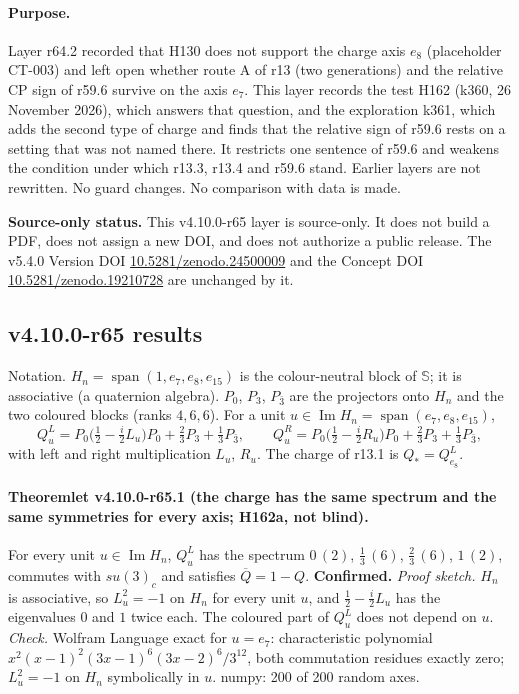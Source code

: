 \paragraph{Purpose.}
Layer r64.2 recorded that H130 does not support the charge axis \(e_8\) (placeholder CT-003) and left open whether route A of r13 (two generations)
and the relative CP sign of r59.6 survive on the axis \(e_7\).  This layer records the test H162 (k360, 26 November 2026), which answers that
question, and the exploration k361, which adds the second type of charge and finds that the relative sign of r59.6 rests on a setting that was
not named there.  It restricts one sentence of r59.6 and weakens the condition under which r13.3, r13.4 and r59.6 stand.  Earlier layers are not
rewritten.  No guard changes.  No comparison with data is made.

\noindent\textbf{Source-only status.}
This v4.10.0-r65 layer is source-only.  It does not build a PDF, does not assign a new DOI,
and does not authorize a public release.  The v5.4.0 Version DOI
\href{https://doi.org/10.5281/zenodo.24500009}{10.5281/zenodo.24500009} and the Concept DOI
\href{https://doi.org/10.5281/zenodo.19210728}{10.5281/zenodo.19210728} are unchanged by it.

\subsection*{v4.10.0-r65 results}
\label{subsec:v4100-r65-results}

Notation.  \(H_n=\operatorname{span}(1,e_7,e_8,e_{15})\) is the colour-neutral block of \(\mathbb S\); it is associative (a quaternion algebra).
\(P_0\), \(P_3\), \(P_{\bar3}\) are the projectors onto \(H_n\) and the two coloured blocks (ranks \(4,6,6\)).  For a unit
\(u\in\operatorname{Im}H_n=\operatorname{span}(e_7,e_8,e_{15})\),
\[
Q^{L}_u=P_0\bigl(\tfrac12-\tfrac i2L_u\bigr)P_0+\tfrac23P_3+\tfrac13P_{\bar3},
\qquad
Q^{R}_u=P_0\bigl(\tfrac12-\tfrac i2R_u\bigr)P_0+\tfrac23P_3+\tfrac13P_{\bar3},
\]
with left and right multiplication \(L_u\), \(R_u\).  The charge of r13.1 is \(Q_*=Q^L_{e_8}\).

\paragraph{Theoremlet v4.10.0-r65.1 (the charge has the same spectrum and the same symmetries for every axis; H162a, not blind).}
For every unit \(u\in\operatorname{Im}H_n\), \(Q^L_u\) has the spectrum \(0\,(2)\), \(\tfrac13\,(6)\), \(\tfrac23\,(6)\), \(1\,(2)\), commutes with
\(su(3)_c\) and satisfies \(\overline{Q}=1-Q\).  \textbf{Confirmed.}
\emph{Proof sketch.}  \(H_n\) is associative, so \(L_u^2=-1\) on \(H_n\) for every unit \(u\), and \(\tfrac12-\tfrac i2L_u\) has the eigenvalues
\(0\) and \(1\) twice each.  The coloured part of \(Q^L_u\) does not depend on \(u\).
\emph{Check.} Wolfram Language exact for \(u=e_7\): characteristic polynomial \(x^2(x-1)^2(3x-1)^6(3x-2)^6/3^{12}\), both commutation residues
exactly zero; \(L_u^2=-1\) on \(H_n\) symbolically in \(u\).  numpy: 200 of 200 random axes.

